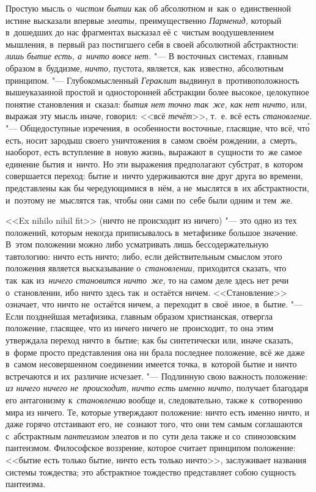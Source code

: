 Простую мысль о~{\em чистом бытии} как об абсолютном и~как о~единственной
истине высказали впервые {\em элеаты,} преимущественно {\em Парменид,} который
в~дошедших до нас фрагментах высказал её с~чистым воодушевлением мышления,
в~первый раз постигшего себя в своей абсолютной абстрактности:
{\em лишь бытие есть, а~ничто вовсе нет.} "--- В восточных системах, главным
образом в~буддизме, {\em ничто,} пустота, является, как~известно, абсолютным
принципом. "--- Глубокомысленный {\em Гераклит} выдвинул в~противоположность
вышеуказанной простой и односторонней абстракции более высокое, целокупное
понятие становления и~сказал: {\em бытия нет точно так~же, как нет ничто,} или,
выражая эту мысль иначе, говорил: <<всё {\em течёт}>>, т.~е. всё есть
{\em становление}. "--- Общедоступные изречения, в~особенности восточные,
гласящие, что всё, чт\'{о} есть, носит зародыш своего уничтожения в~самом своём
рождении, а~смерть, наоборот, есть вступление в~новую жизнь, выражают
в~сущности то~же самое единение бытия и~ничто. Но эти выражения предполагают
субстрат, в~котором совершается переход: бытие и~ничто удерживаются вне друг
друга во времени, представлены как бы чередующимися в~нём, а не~мыслятся в~их
абстрактности, и~поэтому не~мыслятся так, чтобы они сами по~себе были одним и
тем~же.

<<Ex nihilo nihil fit>> (ничто не происходит из ничего) "--- это одно из тех
положений, которым некогда приписывалось в~метафизике большое значение. В~этом
положении можно либо усматривать лишь бессодержательную тавтологию: ничто есть
ничто; либо, если действительным смыслом этого положения является высказывание
о~{\em становлении,} приходится сказать, что так~как из~{\em ничего становится
ничто~же,} то на самом деле здесь нет речи о~становлении, ибо ничто здесь так~и
остаётся ничем. <<Становление>> означает, что ничто не~остаётся ничем,
а~переходит в~своё~иное, в~бытие. "--- Если позднейшая метафизика, главным
образом христианская, отвергла положение, гласящее, что из ничего ничего
не~происходит, то она этим утверждала переход ничто в~бытие; как бы
синтетически или, иначе сказать, в~форме просто представления она ни брала
последнее положение, всё же даже в~самом несовершенном соединении имеется
точка, в~которой бытие и ничто встречаются и их~различие исчезает. "---
Подлинную свою важность положение: {\em из ничего ничего не~происходит, ничто
есть именно ничто,} получает благодаря его антагонизму к~{\em становлению}
вообще и, следовательно, также к~сотворению мира из ничего. Те, которые
утверждают положение: ничто есть именно ничто, и даже горячо отстаивают его,
не~сознают того, что они тем самым соглашаются с~абстрактным {\em пантеизмом}
элеатов и по~сути дела также и со~спинозовским пантеизмом. Философское
воззрение, которое считает принципом положение: <<бытие есть только бытие,
ничто есть только ничто>>, заслуживает названия системы тождества; это
абстрактное тождество представляет собою сущность пантеизма.

